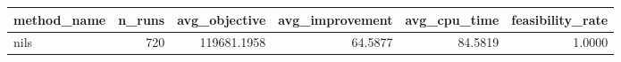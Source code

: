 \begin{tabular}{lrrrrr}
\toprule
method_name & n_runs & avg_objective & avg_improvement & avg_cpu_time & feasibility_rate \\
\midrule
nils & 720 & 119681.1958 & 64.5877 & 84.5819 & 1.0000 \\
\bottomrule
\end{tabular}
